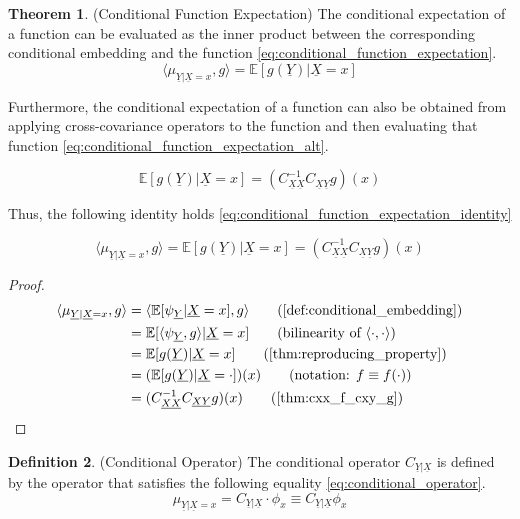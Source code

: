 \documentclass[twoside]{article} \usepackage{aistats2017}
\theoremstyle{definition}
\newtheorem{theorem}{Theorem}[section]
\newtheorem{definition}[theorem]{Definition}
\newcommand{\rv}[1]{\underline{#1}}
\newcommand{\expect}[1]{{\mathbb{E}[#1]}}
\newcommand{\inner}[2]{{\langle #1, #2 \rangle}}
\newcommand{\muYx}{\mu_{\rv{Y} | \rv{X} = x}}
\newcommand{\psiY}{\psi_{\rv{Y}}}
\newcommand{\Cxy}{C_{\rv{X} \rv{Y}}}
\newcommand{\Cxx}{C_{\rv{X} \rv{X}}}
\newcommand{\Cylx}{C_{\rv{Y} | \rv{X}}}
\begin{document}
	\begin{theorem} \label{thm:conditional_function_expectation}
		(Conditional Function Expectation)
		The conditional expectation of a function can be evaluated as the inner product between the corresponding conditional embedding and the function \eqref{eq:conditional_function_expectation}.
		\begin{equation}
			\inner{\muYx}{g} = \expect{g(\rv{Y}) | \rv{X} = x}
		\label{eq:conditional_function_expectation}
		\end{equation}
		
		Furthermore, the conditional expectation of a function can also be obtained from applying cross-covariance operators to the function and then evaluating that function \eqref{eq:conditional_function_expectation_alt}.
		
		\begin{equation}
			\expect{g(\rv{Y}) | \rv{X} = x} = (\Cxx^{-1} \Cxy g)(x)
		\label{eq:conditional_function_expectation_alt}
		\end{equation}
		
		Thus, the following identity holds \eqref{eq:conditional_function_expectation_identity}
		
		\begin{equation}
			\inner{\muYx}{g} = \expect{g(\rv{Y}) | \rv{X} = x} = (\Cxx^{-1} \Cxy g)(x)
		\label{eq:conditional_function_expectation_identity}	
		\end{equation}

		\begin{proof}
			\begin{align*}
				\inner{\muYx}{g} &= \inner{\expect{\psiY | \rv{X} = x}}{g} \tag{\cref{def:conditional_embedding}} \\
				&= \expect{\inner{\psiY}{g} | \rv{X} = x} \tag{bilinearity of $\inner{\cdot}{\cdot}$} \\
				&= \expect{g(\rv{Y}) | \rv{X} = x} \tag{\cref{thm:reproducing_property}} \\
				&= (\expect{g(\rv{Y}) | \rv{X} = \cdot})(x) \tag{notation: $f \equiv f(\cdot)$} \\
				&= (\Cxx^{-1} \Cxy g)(x) \tag{\cref{thm:cxx_f_cxy_g}}
			\end{align*}
		\end{proof}
	\end{theorem}
	
	\begin{definition} \label{def:conditional_operator}
		(Conditional Operator)
		The conditional operator $\Cylx$ is defined by the operator that satisfies the following equality \eqref{eq:conditional_operator}.
		\begin{equation}
			\muYx = \Cylx \cdot \phi_{x} \equiv \Cylx \phi_{x}
		\label{eq:conditional_operator}
		\end{equation}
	\end{definition}
\end{document}

